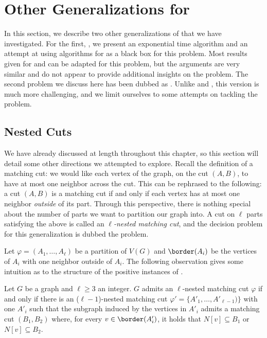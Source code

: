 \section{Other Generalizations for }

In this section, we describe two other generalizations of  that we have investigated.
For the first, , we present an exponential time algorithm and an attempt at using algorithms for  as a black box for this problem.
Most results given for  and  can be adapted for this problem, but the arguments are very similar and do not appear to provide additional insights on the problem.
The second problem we discuss here has been dubbed as .
Unlike  and , this version is much more challenging, and we limit ourselves to some attempts on tackling the problem.

\subsection{Nested Cuts}

We have already discussed  at length throughout this chapter, so this section will detail some other directions we attempted to explore.
Recall the definition of a matching cut: we would like each vertex of the graph, on the cut $(A,B)$, to have at most one neighbor across the cut.
This can be rephrased to the following: a cut $(A,B)$ is a matching cut if and only if each vertex has at most one neighbor \textit{outside} of its part.
Through this perspective, there is nothing special about the number of parts we want to partition our graph into.
A cut on $\ell$ parts satisfying the above is called an \textit{$\ell$-nested matching cut}, and the decision problem for this generalization is dubbed the  problem.


Let $\varphi = (A_1, \dots, A_\ell)$ be a partition of $V(G)$ and $\border(A_i)$ be the vertices of $A_i$ with one neighbor outside of $A_i$.
The following observation gives some intuition as to the structure of the positive instances of .

\begin{observation}
	\label{obs:nested_cut}
    Let $G$ be a graph and $\ell \geq 3$ an integer.
    $G$ admits an $\ell$-nested matching cut $\varphi$ if and only if there is an ($\ell-1$)-nested matching cut $\varphi' = \{A'_1, \dots, A'_{\ell - 1})\}$ with one $A'_i$ such that the subgraph induced by the vertices in $A'_i$ admits a matching cut $(B_1, B_2)$ where, for every $v \in \border(A'_i)$, it holds that $N[v] \subseteq B_1$ or $N[v] \subseteq B_2$.
\end{observation}

